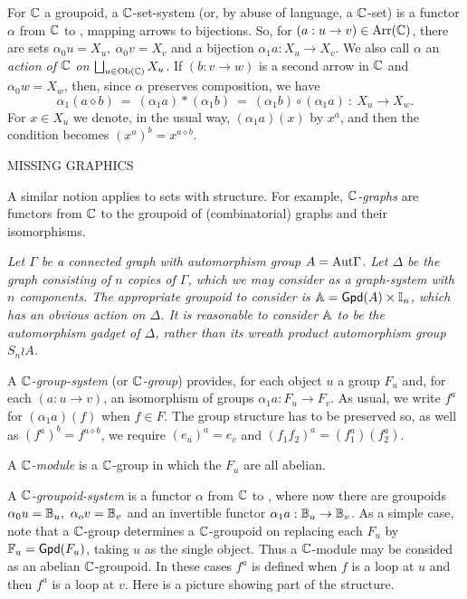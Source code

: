 For $\mathbb{C}$ a groupoid, a $\mathbb{C}$-set-system 
(or, by abuse of language, a $\mathbb{C}$-set) 
is a functor $\alpha$  from $\mathbb{C}$ to \catSet, mapping arrows to bijections.  
So, for $(a : u \to v) \in \mathrm{Arr}(\mathbb{C})$, there are sets 
$\alpha_0u = X_u,~ \alpha_0v = X_v$ 
and a bijection $\alpha_1a : X_u \to X_v$.  
We also call $\alpha$ an 
\emph{action of $\mathbb{C}$ on $\bigsqcup_{u \in \mathrm{Ob}(\mathbb{C})}X_u$}. 
If $(b : v \to w)$ is a second arrow in $\mathbb{C}$ and $\alpha_0w = X_w$,
then, since $\alpha$ preserves composition, we have 
$$
\alpha_1(a \diamond b) ~=~ (\alpha_1a)*(\alpha_1b) 
                       ~=~ (\alpha_1b)\circ(\alpha_1a) ~:~ X_u \to X_w.
$$
For $x \in X_u$ we denote, in the usual way, $(\alpha_1a)(x)$ by $x^a$, 
and then the condition becomes $(x^a)^b = x^{a \diamond b}$. 
\begin{center}
MISSING GRAPHICS
\end{center}

A similar notion applies to sets with structure. 
For example, \emph{$\mathbb{C}$-graphs} are functors from $\mathbb{C}$ to the groupoid 
of (combinatorial) graphs and their isomorphisms. 

\begin{example}
\emph{
Let $\Gamma$ be a connected graph with automorphism group $A=\mathrm{Aut}\Gamma$. 
Let $\Delta$ be the graph consisting of $n$ copies of $\Gamma$, 
which we may consider as a \emph{graph-system} with $n$ components. 
The appropriate groupoid to consider is $\mathbb{A} = {\sf Gpd}(A)\times\mathbb{I}_n$, 
which has an obvious action on $\Delta$. 
It is reasonable to consider $\mathbb{A}$ to be 
the automorphism gadget of $\Delta$, 
rather than its wreath product automorphism group $S_n \wr A$. 
}\end{example}

A \emph{$\mathbb{C}$-group-system} (or \emph{$\mathbb{C}$-group}) provides, 
for each object $u$ a group $F_u$ and, for each $(a : u \to v)$, 
an isomorphism of groups  $\alpha_1a : F_u \to F_v$. 
As usual, we write $f^a$ for $(\alpha_1a)(f)$ when $f \in F$. 
The group structure has to be preserved so, 
as well as  $(f^a)^b = f^{a \diamond b}$, 
we require $(e_u)^a = e_v$ and $(f_1f_2)^a = (f_1^a)(f_2^a)$. 

A \emph{$\mathbb{C}$-module} is a $\mathbb{C}$-group in which the $F_u$ are all abelian. 

A \emph{$\mathbb{C}$-groupoid-system} is a functor 
$\alpha$ from $\mathbb{C}$ to \catGpd, 
where now there are groupoids $\alpha_0u = \mathbb{B}_u,~ \alpha_ov = \mathbb{B}_v$ 
and an invertible functor $\alpha_1a : \mathbb{B}_u \to \mathbb{B}_v$. 
As a simple case, note that a $\mathbb{C}$-group determines a $\mathbb{C}$-groupoid 
on replacing each $F_u$ by $\mathbb{F}_u = {\sf Gpd}(F_u)$, 
taking $u$ as the single object. 
Thus a $\mathbb{C}$-module may be consided as an abelian $\mathbb{C}$-groupoid. 
In these cases $f^a$ is defined when $f$ is a loop at $u$ 
and then $f^a$ is a loop at $v$. 
Here is a picture showing part of the structure.

